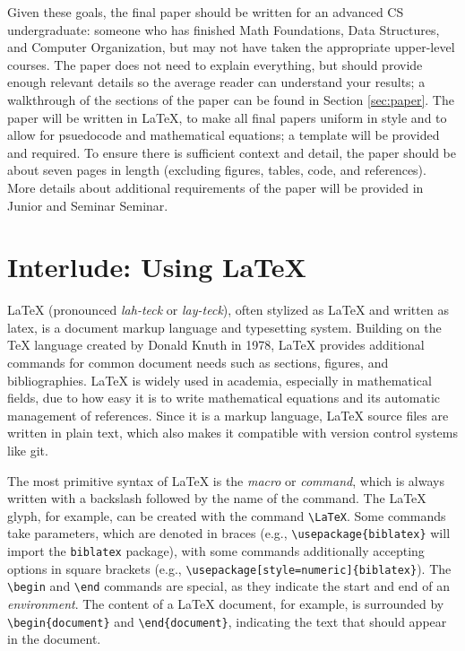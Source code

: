\documentclass[10pt,twocolumn]{article}
\begin{document}
Given these goals, the final paper should be written for an advanced CS undergraduate: someone who has finished Math Foundations, Data Structures, and Computer Organization, but may not have taken the appropriate upper-level courses.
The paper does not need to explain everything, but should provide enough relevant details so the average reader can understand your results; a walkthrough of the sections of the paper can be found in Section \ref{sec:paper}.
The paper will be written in LaTeX, to make all final papers uniform in style and to allow for psuedocode and mathematical equations; a template will be provided and required.
To ensure there is sufficient context and detail, the paper should be about seven pages in length (excluding figures, tables, code, and references).
More details about additional requirements of the paper will be provided in Junior and Seminar Seminar.

\section{Interlude: Using \LaTeX}

LaTeX (pronounced \textit{lah-teck} or \textit{lay-teck}), often stylized as {\LaTeX} and written as latex, is a document markup language and typesetting system.
Building on the {\TeX} language created by Donald Knuth in 1978, LaTeX provides additional commands for common document needs such as sections, figures, and bibliographies.
LaTeX is widely used in academia, especially in mathematical fields, due to how easy it is to write mathematical equations and its automatic management of references.
Since it is a markup language, LaTeX source files are written in plain text, which also makes it compatible with version control systems like git.

The most primitive syntax of LaTeX is the \textit{macro} or \textit{command}, which is always written with a backslash followed by the name of the command.
The {\LaTeX} glyph, for example, can be created with the command \texttt{\textbackslash LaTeX}.
Some commands take parameters, which are denoted in braces (e.g., \texttt{\textbackslash usepackage\{biblatex\}} will import the \texttt{biblatex} package), with some commands additionally accepting options in square brackets (e.g., \texttt{\textbackslash usepackage[style=numeric]\{biblatex\}}).
The \texttt{\textbackslash begin} and \texttt{\textbackslash end} commands are special, as they indicate the start and end of an \textit{environment}.
The content of a LaTeX document, for example, is surrounded by \texttt{\textbackslash begin\{document\}} and \texttt{\textbackslash end\{document\}}, indicating the text that should appear in the document.
\end{document}

